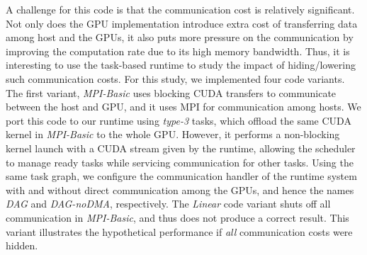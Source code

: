 A challenge for this code is that the communication cost is relatively significant.
Not only does the GPU implementation introduce extra cost of transferring data among host and the GPUs, it also puts more pressure on the communication by improving the computation rate due to its high memory bandwidth.
Thus, it is interesting to use the task-based runtime to study the impact of hiding/lowering such communication costs.
For this study, we implemented four code variants.
The first variant, {\em MPI-Basic} uses blocking CUDA transfers to communicate between the host and GPU, and it uses MPI for communication among hosts.
We port this code to our runtime using {\em type-3} tasks, which offload the same CUDA kernel in {\em MPI-Basic} to the whole GPU.
However, it performs a non-blocking kernel launch with a CUDA stream given by the runtime, allowing the scheduler to manage ready tasks while servicing communication for other tasks.
Using the same task graph, we configure the communication handler of the runtime system with and without direct communication among the GPUs, and hence the names {\em DAG} and {\em DAG-noDMA}, respectively.
The {\em Linear} code variant shuts off all communication in {\em MPI-Basic}, and thus does not produce a correct result.
This variant illustrates the hypothetical performance if {\em all} communication costs were hidden.

